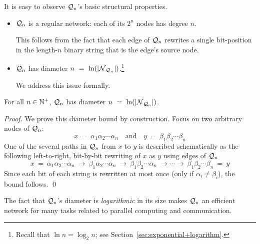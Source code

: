 \medskip

\noindent
It is easy to observe $\mbox{$\cal Q$}_n$'s basic structural properties.
\begin{itemize}
\item {}
$\mbox{$\cal Q$}_n$ is a regular network: each of its $2^n$ nodes has degree $n$.

This follows from the fact that each edge of $\mbox{$\cal Q$}_n$ rewrites a single
bit-position in the length-$n$ binary string that is the edge's source
node.

\item {}
$\mbox{$\cal Q$}_n$ has diameter $n \ = \ \ln(|\mbox{$\cal N$}_{\mbox{{\scriptsize $\cal Q$}}_n}|)$.\footnote{Recall that
  $\ln n = \log_2 n$; see Section~\ref{sec:exponential+logarithm}.}

We address this issue formally.
\end{itemize}

\begin{prop}
\label{thm:hypercube-diameter}
For all $n \in \mathbb{N}^+$, $\mbox{$\cal Q$}_n$ has diameter $n \ = \ \ln(|\mbox{$\cal N$}_{\mbox{{\scriptsize $\cal Q$}}_n}|)$.
\end{prop}

\begin{proof}
We prove this diameter bound by construction.  Focus on two arbitrary
nodes of $\mbox{$\cal Q$}_n$:
\[ x \ = \ \alpha_1 \alpha_2 \cdots \alpha_n \ \ \ \mbox{ and } \ \ \
y \ = \ \beta_1 \beta_2 \cdots \beta_n
\]
One of the several paths in $\mbox{$\cal Q$}_n$ from $x$ to $y$ is described
schematically as the following left-to-right, bit-by-bit rewriting of
$x$ as $y$ using edges of $\mbox{$\cal Q$}_n$
\[
x \ = \ \alpha_1 \alpha_2 \cdots \alpha_n \ \rightarrow \
\beta_1 \alpha_2 \cdots \alpha_n \ \rightarrow \
\beta_1 \beta_2\cdots \alpha_n \ \rightarrow \cdots \rightarrow\ 
\beta_1 \beta_2 \cdots \beta_n \ = \ y
\]
Since each bit of each string is rewritten at most once (only if $\alpha_i \neq \beta_i$), the bound follows.
\qed
\end{proof}

\medskip

The fact that $\mbox{$\cal Q$}_n$'s diameter is {\em logarithmic} in its size makes
$\mbox{$\cal Q$}_n$ an efficient network for many tasks related to parallel
computing and communication.
\bigskip

